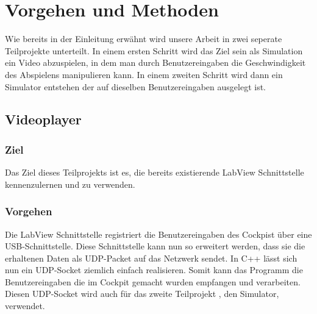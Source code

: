 \section{Vorgehen und Methoden}
Wie bereits in der Einleitung erwähnt wird unsere Arbeit in zwei seperate Teilprojekte unterteilt. In einem ersten Schritt wird das Ziel sein als Simulation ein Video abzuspielen, in dem man durch Benutzereingaben die Geschwindigkeit des Abspielens manipulieren kann. In einem zweiten Schritt wird dann ein Simulator entstehen der auf dieselben Benutzereingaben ausgelegt ist. 
\subsection{Videoplayer}
\subsubsection{Ziel}
Das Ziel dieses Teilprojekts ist es, die bereits existierende LabView Schnittstelle kennenzulernen und zu verwenden. 
\subsubsection{Vorgehen}
Die LabView Schnittstelle registriert die Benutzereingaben des Cockpist über eine USB-Schnittstelle. Diese Schnittstelle kann nun so erweitert werden, dass sie die erhaltenen Daten als UDP-Packet auf das Netzwerk sendet. In C++ lässt sich nun ein UDP-Socket ziemlich einfach realisieren. Somit kann das Programm die Benutzereingaben die im Cockpit gemacht wurden empfangen und verarbeiten. Diesen UDP-Socket wird auch für das zweite Teilprojekt , den Simulator, verwendet. 